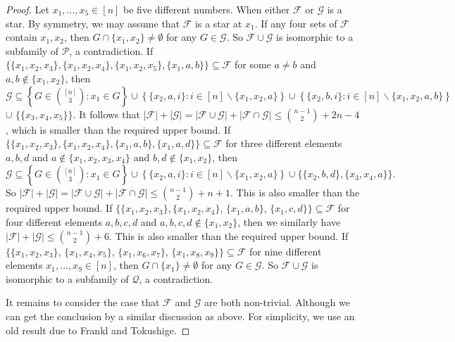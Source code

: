\documentclass[11pt]{article}
\numberwithin{equation}{section}
\begin{document}
\begin{proof}
Let $x_1, \ldots, x_5\in [n]$ be five different numbers.
When either $\mathcal{F}$ or $\mathcal{G}$ is a star. By symmetry, we may assume that $\mathcal{F}$ is a star at $x_1$.
If any four sets of $\mathcal{F}$ contain $x_1, x_2$, then $G\cap \{x_1,x_2\}\neq \emptyset$ for any $G\in \mathcal{G}$. So $\mathcal{F}\cup \mathcal{G}$ is isomorphic to a subfamily of $\mathcal{P}$, a contradiction.
If $\{\{x_1,x_2,x_3\}, \{x_1,x_2,x_4\}, \{x_1,x_2,x_5\}, \{x_1,a,b\}  \}\subseteq \mathcal{F}$ for some $a\neq b$ and $a,b\notin \{x_1, x_2\}$, then $
\mathcal{G}\subseteq \left\{G \in\binom{[n]}{3}: x_1\in G\right\}\cup\left\{\{x_2,a, i\}:  i\in [n]\backslash\{x_1,x_2,a\}\right\}
\cup\left\{\{x_2,b, i\}:  i\in [n]\backslash\{x_1,x_2,a,b\}\right\}$ $\cup $ 
$\{\{x_3,x_4,x_5\}\}.
$
It follows that
$
|\mathcal{F}|+|\mathcal{G}|=|\mathcal{F}\cup \mathcal{G}|+|\mathcal{F}\cap \mathcal{G}|\leq \binom{n-1}{2}+2n-4$,
which is smaller than the required upper bound.
If  $\{\{x_1,x_2,x_3\}, \{x_1,x_2,x_4\}, \{x_1,a,b\}, \{x_1,a,d\}  \}\subseteq \mathcal{F}$ for three different elements $a, b, d$ and $a\notin \{x_1, x_2, x_3, x_4\}$ and $b, d\notin\{x_1, x_2\}$, then
$
\mathcal{G}\subseteq\left\{G \in\binom{[n]}{3}: x_1\in G\right\}\cup\left\{\{x_2,a, i\}:  i\in [n]\backslash\{x_1,x_2,a\}\right\}\cup\{\{x_2,b,d\},\{x_3,x_4,a\}\}.
$
So $|\mathcal{F}|+|\mathcal{G}|=|\mathcal{F}\cup \mathcal{G}|+|\mathcal{F}\cap \mathcal{G}|\leq \binom{n-1}{2}+n+1$. This is also smaller than the required upper bound.
If $\{\{x_1,x_2,x_3\}, \{x_1,x_2,x_4\}$, $\{x_1,a,b\}$, $\{x_1,c,d\}  \}\subseteq \mathcal{F}$ for four different elements $a, b, c, d$ and $a, b,c, d\notin \{x_1, x_2\}$, then we similarly have $|\mathcal{F}|+|\mathcal{G}|\leq \binom{n-1}{2}+6$. This is also smaller than the required upper bound.
If $\{\{x_1,x_2,x_3\}$, $\{x_1,x_4,x_5\}$, $\{x_1,x_6,x_7\}$, 
$\{x_1,x_8,x_9\}  \}\subseteq \mathcal{F}$ for nine different elements $x_1, \ldots, x_9 \in [n]$, then $G\cap \{x_1\}\neq \emptyset$ for any $G\in \mathcal{G}$. So $\mathcal{F}\cup \mathcal{G}$ is isomorphic to a subfamily of $\mathcal{Q}$, a contradiction.

It remains to consider the case that  $\mathcal{F}$ and $\mathcal{G}$ are both non-trivial. Although we can get the conclusion by a similar discussion as above. For simplicity, we use an old result due to Frankl and Tokushige.


\end{proof}
\end{document}
